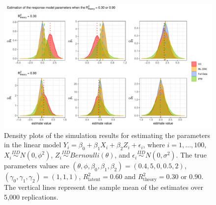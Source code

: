 \documentclass[
  12pt,
]{article}
\begin{document}
\begin{figure}

{\centering \includegraphics{wrtie-up_files/figure-latex/sampldist-1} 

}

\caption{Density plots of the simulation results for estimating the parameters in the linear model $Y_i = \beta_0 + \beta_1 X_i + \beta_2 Z_i + \epsilon_i$, where $i = 1,...,100$, $X_i \overset{IID}{\sim} N(0, \phi^2)$, $Z_i \overset{IID}{\sim} Bernoulli(\theta)$, and $\epsilon_i \overset{IID}{\sim} N(0, \sigma^2)$. The true parameters values are $(\theta, \phi, \beta_0, \beta_1, \beta_2) = (0.4, 5, 0, 0.5, 2)$, $(\gamma_0, \gamma_1, \gamma_2) = (1, 1, 1)$, $R_{\mathrm{latent}}^2 = 0.60$ and $R_{\mathrm{theory}}^2 = 0.30 \text{ or } 0.90$. The vertical lines represent the sample mean of the estimates over 5,000 replications.}\label{fig:sampldist}
\end{figure}
\end{document}
